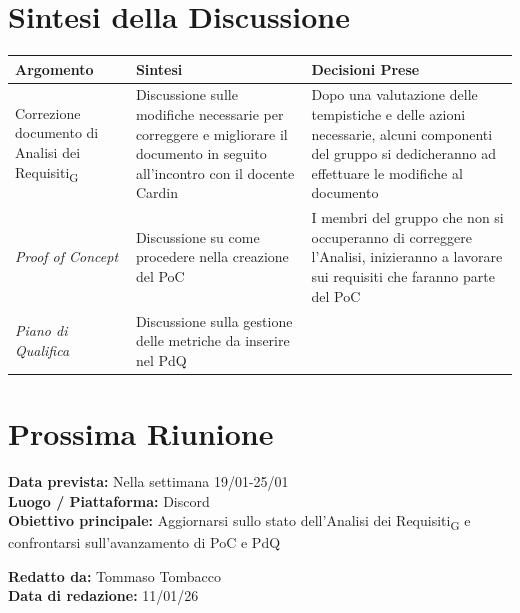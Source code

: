 \documentclass[a4paper,12pt]{article}
\newcommand{\gls}[1]{#1\textsubscript{G}}
\begin{document}
\section*{ Sintesi della Discussione}

\begin{longtable}{|p{}|p{}|p{}|}
\hline
\textbf{Argomento} & \textbf{Sintesi} & \textbf{Decisioni Prese} \\ \hline
Correzione documento di \gls{Analisi dei Requisiti} & Discussione sulle modifiche necessarie per correggere e migliorare il documento in seguito all'incontro con il docente Cardin & Dopo una valutazione delle tempistiche e delle azioni necessarie, alcuni componenti del gruppo si dedicheranno ad effettuare le modifiche al documento \\ \hline
\textit{Proof of Concept} & Discussione su come procedere nella creazione del PoC & I membri del gruppo che non si occuperanno di correggere l'Analisi, inizieranno a lavorare sui requisiti che faranno parte del PoC \\ \hline
\textit {Piano di Qualifica} & Discussione sulla gestione delle metriche da inserire nel PdQ & \\ \hline
\end{longtable}

\section*{ Prossima Riunione}
\textbf{Data prevista:} Nella settimana 19/01-25/01 \\
\textbf{Luogo / Piattaforma:} Discord \\
\textbf{Obiettivo principale:} Aggiornarsi sullo stato dell'\gls{Analisi dei Requisiti} e confrontarsi sull'avanzamento di PoC e PdQ


\textbf{Redatto da:} Tommaso Tombacco \\
\textbf{Data di redazione:} 11/01/26
\end{document}
